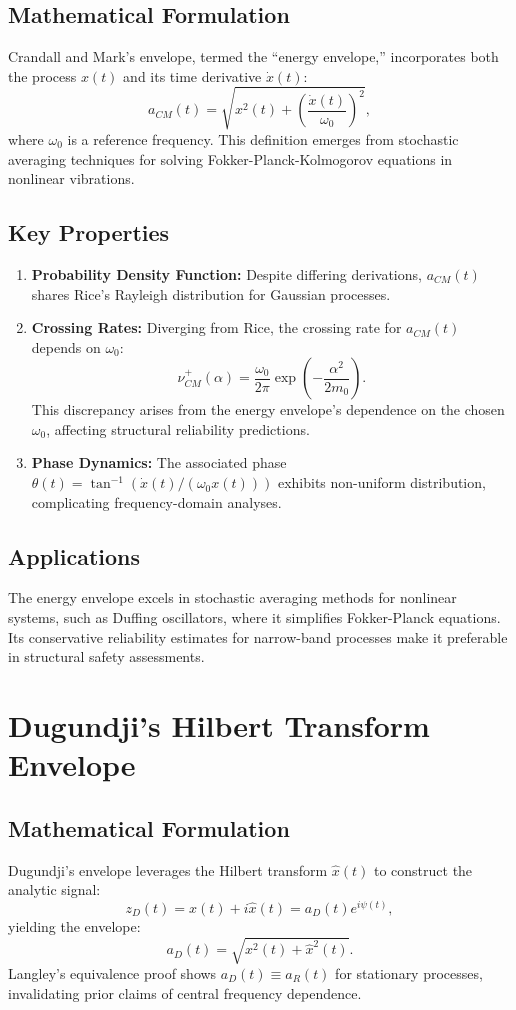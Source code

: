 \documentclass[12pt]{article}
\begin{document}
\subsection{Mathematical Formulation}
Crandall and Mark’s envelope, termed the ``energy envelope,'' incorporates both the process $x(t)$ and its time derivative $\dot{x}(t)$:
\[
a_{CM}(t) = \sqrt{x^2(t) + \left(\frac{\dot{x}(t)}{\omega_0}\right)^2},
\]
where $\omega_0$ is a reference frequency. This definition emerges from stochastic averaging techniques for solving Fokker-Planck-Kolmogorov equations in nonlinear vibrations.

\subsection{Key Properties}
\begin{enumerate}
    \item \textbf{Probability Density Function:} Despite differing derivations, $a_{CM}(t)$ shares Rice’s Rayleigh distribution for Gaussian processes.
    \item \textbf{Crossing Rates:} Diverging from Rice, the crossing rate for $a_{CM}(t)$ depends on $\omega_0$:
    \[
    \nu_{CM}^+(\alpha) = \frac{\omega_0}{2\pi} \exp\left(-\frac{\alpha^2}{2m_0}\right).
    \]
    This discrepancy arises from the energy envelope’s dependence on the chosen $\omega_0$, affecting structural reliability predictions.
    \item \textbf{Phase Dynamics:} The associated phase $\theta(t) = \tan^{-1}(\dot{x}(t)/(\omega_0 x(t)))$ exhibits non-uniform distribution, complicating frequency-domain analyses.
\end{enumerate}

\subsection{Applications}
The energy envelope excels in stochastic averaging methods for nonlinear systems, such as Duffing oscillators, where it simplifies Fokker-Planck equations. Its conservative reliability estimates for narrow-band processes make it preferable in structural safety assessments.

\section{Dugundji’s Hilbert Transform Envelope}

\subsection{Mathematical Formulation}
Dugundji’s envelope leverages the Hilbert transform $\hat{x}(t)$ to construct the analytic signal:
\[
z_D(t) = x(t) + i\hat{x}(t) = a_D(t)e^{i\psi(t)},
\]
yielding the envelope:
\[
a_D(t) = \sqrt{x^2(t) + \hat{x}^2(t)}.
\]
Langley’s equivalence proof shows $a_D(t) \equiv a_R(t)$ for stationary processes, invalidating prior claims of central frequency dependence.
\end{document}
